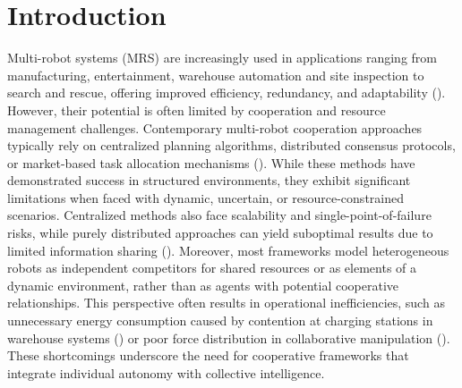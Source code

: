 \documentclass[Afour,sageh,times]{sagej}
\begin{document}
\section{Introduction}
\label{sec:intro}
Multi-robot systems (MRS) are increasingly used in applications ranging from manufacturing, entertainment, warehouse automation and site inspection to search and rescue, offering improved efficiency, redundancy, and adaptability (\cite{parker2008Distributed, yan2013Survey, laviers2025Robots}). However, their potential is often limited by cooperation and resource management challenges. Contemporary multi-robot cooperation approaches typically rely on centralized planning algorithms, distributed consensus protocols, or market-based task allocation mechanisms (\cite{gerkey2004formal, khamis2015Multirobot}). While these methods have demonstrated success in structured environments, they exhibit significant limitations when faced with dynamic, uncertain, or resource-constrained scenarios. Centralized methods also face scalability and single-point-of-failure risks, while purely distributed approaches can yield suboptimal results due to limited information sharing (\cite{gerkey2004formal, khamis2015Multirobot, farinelli2017Distributed}). Moreover, most frameworks model heterogeneous robots as independent competitors for shared resources or as elements of a dynamic environment, rather than as agents with potential cooperative relationships. This perspective often results in operational inefficiencies, such as unnecessary energy consumption caused by contention at charging stations in warehouse systems (\cite{riazi2021Energy}) or poor force distribution in collaborative manipulation (\cite{erden2008Free}). These shortcomings underscore the need for cooperative frameworks that integrate individual autonomy with collective intelligence. 
\end{document}
